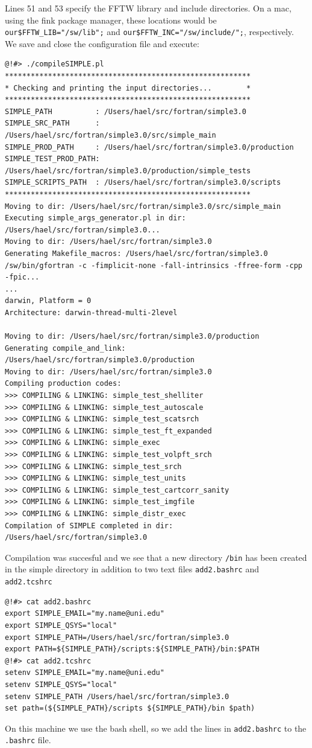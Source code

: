 \documentclass[a4paper,11pt]{article}
\begin{document}
Lines 51 and 53 specify the FFTW library and include directories. On a mac, using the fink package manager, these locations would be \texttt{our\$FFTW\_LIB="/sw/lib";} and \texttt{our\$FFTW\_INC="/sw/include/";}, respectively. We save and close the configuration file and execute:
\begin{verbatim}
@!#> ./compileSIMPLE.pl 
*********************************************************
* Checking and printing the input directories...        *
*********************************************************
SIMPLE_PATH          : /Users/hael/src/fortran/simple3.0
SIMPLE_SRC_PATH      : /Users/hael/src/fortran/simple3.0/src/simple_main
SIMPLE_PROD_PATH     : /Users/hael/src/fortran/simple3.0/production
SIMPLE_TEST_PROD_PATH: /Users/hael/src/fortran/simple3.0/production/simple_tests
SIMPLE_SCRIPTS_PATH  : /Users/hael/src/fortran/simple3.0/scripts
*********************************************************
Moving to dir: /Users/hael/src/fortran/simple3.0/src/simple_main
Executing simple_args_generator.pl in dir: /Users/hael/src/fortran/simple3.0...
Moving to dir: /Users/hael/src/fortran/simple3.0
Generating Makefile_macros: /Users/hael/src/fortran/simple3.0
/sw/bin/gfortran -c -fimplicit-none -fall-intrinsics -ffree-form -cpp -fpic...
...
darwin, Platform = 0
Architecture: darwin-thread-multi-2level

Moving to dir: /Users/hael/src/fortran/simple3.0/production
Generating compile_and_link: /Users/hael/src/fortran/simple3.0/production
Moving to dir: /Users/hael/src/fortran/simple3.0
Compiling production codes:
>>> COMPILING & LINKING: simple_test_shelliter
>>> COMPILING & LINKING: simple_test_autoscale
>>> COMPILING & LINKING: simple_test_scatsrch
>>> COMPILING & LINKING: simple_test_ft_expanded
>>> COMPILING & LINKING: simple_exec
>>> COMPILING & LINKING: simple_test_volpft_srch
>>> COMPILING & LINKING: simple_test_srch
>>> COMPILING & LINKING: simple_test_units
>>> COMPILING & LINKING: simple_test_cartcorr_sanity
>>> COMPILING & LINKING: simple_test_imgfile
>>> COMPILING & LINKING: simple_distr_exec
Compilation of SIMPLE completed in dir: /Users/hael/src/fortran/simple3.0
\end{verbatim}
Compilation was succesful and we see that a new directory \texttt{/bin} has been created in the simple directory in addition to two text files \texttt{add2.bashrc} and \texttt{add2.tcshrc}
\begin{verbatim}
@!#> cat add2.bashrc 
export SIMPLE_EMAIL="my.name@uni.edu"
export SIMPLE_QSYS="local"
export SIMPLE_PATH=/Users/hael/src/fortran/simple3.0
export PATH=${SIMPLE_PATH}/scripts:${SIMPLE_PATH}/bin:$PATH
@!#> cat add2.tcshrc 
setenv SIMPLE_EMAIL="my.name@uni.edu"
setenv SIMPLE_QSYS="local"
setenv SIMPLE_PATH /Users/hael/src/fortran/simple3.0
set path=(${SIMPLE_PATH}/scripts ${SIMPLE_PATH}/bin $path)
\end{verbatim}
On this machine we use the bash shell, so we add the lines in \texttt{add2.bashrc} to the \texttt{.bashrc} file.
\end{document}
